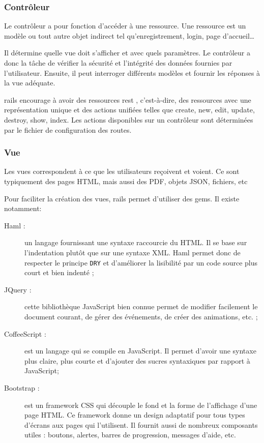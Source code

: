 \subsubsection{Contrôleur}
\label{controleur}
Le contrôleur a pour fonction d'accéder à une ressource. Une ressource est un modèle ou tout autre objet indirect tel qu’enregistrement, login, page d'accueil\ldots

Il détermine quelle vue doit s'afficher et avec quels paramètres. Le contrôleur a donc la tâche de vérifier la sécurité et l'intégrité des données fournies par l'utilisateur. Ensuite, il peut interroger différents modèles et fournir les réponses à la vue adéquate.

\label{rest}\label{rails-routes}
\gls{rails} encourage à avoir des ressources \gls{rest} \cite{wiki-rest}, c'est-à-dire, des ressources avec une représentation unique et des actions unifiées telles que create, new, edit, update, destroy, show, index. Les actions disponibles sur un contrôleur sont déterminées par le fichier de configuration des routes.

\subsubsection{Vue}
Les vues correspondent à ce que les utilisateurs reçoivent et voient. Ce sont typiquement des pages HTML, mais aussi des PDF, objets JSON, fichiers, etc

Pour faciliter la création des vues, \gls{rails} permet d'utiliser des \glspl{gem}. Il existe notamment:
\begin{description}
  \item[Haml \cite{haml} \label{haml} :] un langage fournissant une syntaxe raccourcie du HTML. Il se base sur l'indentation plutôt que sur une syntaxe XML. Haml permet donc de respecter le principe \texttt{DRY} et d'améliorer la lisibilité par un code source plus court et bien indenté ;
  \item[JQuery \cite{jquery} :] cette bibliothèque JavaScript bien connue permet de modifier facilement le document courant, de gérer des événements, de créer des animations, etc. ;
  \item[CoffeeScript \cite{coffeescript} :] est un langage qui se compile en JavaScript. Il permet d'avoir une syntaxe plus claire, plus courte et d'ajouter des sucres syntaxiques par rapport à JavaScript;
  \item[Bootstrap \cite{bootstrap} :] est un framework CSS qui découple le fond et la forme de l'affichage d'une page HTML. Ce framework donne un design adaptatif pour tous types d'écrans aux pages qui l'utilisent. Il fournit aussi de nombreux composants utiles : boutons, alertes, barres de progression, messages d'aide, etc. \label{bootstrap}
\end{description}
